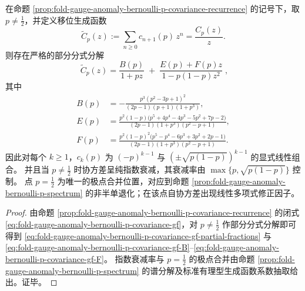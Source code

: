 \begin{corollary}[协方差生成函数的部分分式分解与指数衰减率]\label{cor:fold-gauge-anomaly-bernoulli-p-covariance-partial-fractions}
在命题 \ref{prop:fold-gauge-anomaly-bernoulli-p-covariance-recurrence} 的记号下，取 \(p\neq\tfrac12\)，并定义移位生成函数
\[
\widetilde C_p(z):=\sum_{n\ge 0}c_{n+1}(p)\,z^n=\frac{C_p(z)}{z}.
\]
则存在严格的部分分式分解
\begin{equation}\label{eq:fold-gauge-anomaly-bernoulli-p-covariance-gf-partial-fractions}
\boxed{\;
\widetilde C_p(z)
=\frac{B(p)}{1+p z}
\;+\;
\frac{E(p)+F(p)z}{1-p(1-p)z^2}\;},
\end{equation}
其中
\begin{align}
B(p)&=
-\frac{p^3(p^2-3p+1)^2}{(2p-1)(p+1)(1+p^3)},\label{eq:fold-gauge-anomaly-bernoulli-p-covariance-gf-B}\\
E(p)&=
\frac{p^2(1-p)\bigl(p^5+4p^4-4p^3-5p^2+7p-2\bigr)}{(2p-1)(1+p^3)(p^2-p+1)},\label{eq:fold-gauge-anomaly-bernoulli-p-covariance-gf-E}\\
F(p)&=
\frac{p^2(1-p)^2\bigl(p^5-p^4-6p^3+3p^2+2p-1\bigr)}{(2p-1)(1+p^3)(p^2-p+1)}.\label{eq:fold-gauge-anomaly-bernoulli-p-covariance-gf-F}
\end{align}
因此对每个 \(k\ge 1\)，\(c_k(p)\) 为 \(({-p})^{k-1}\) 与 \((\pm\sqrt{p(1-p)})^{k-1}\) 的显式线性组合。
并且当 \(p\neq\tfrac12\) 时协方差呈纯指数衰减，其衰减率由 \(\max\{p,\sqrt{p(1-p)}\}\) 控制。
点 \(p=\tfrac12\) 为唯一的极点合并位置，对应到命题 \ref{prop:fold-gauge-anomaly-bernoulli-p-spectrum} 的非半单退化；在该点自协方差出现线性多项式修正因子。
\end{corollary}
\begin{proof}
由命题 \ref{prop:fold-gauge-anomaly-bernoulli-p-covariance-recurrence} 的闭式 \eqref{eq:fold-gauge-anomaly-bernoulli-p-covariance-gf}，对 \(p\neq\tfrac12\) 作部分分式分解即可得到 \eqref{eq:fold-gauge-anomaly-bernoulli-p-covariance-gf-partial-fractions} 与 \eqref{eq:fold-gauge-anomaly-bernoulli-p-covariance-gf-B}--\eqref{eq:fold-gauge-anomaly-bernoulli-p-covariance-gf-F}。
指数衰减率与 \(p=\tfrac12\) 的极点合并由命题 \ref{prop:fold-gauge-anomaly-bernoulli-p-spectrum} 的谱分解及标准有理型生成函数系数抽取给出。证毕。
\end{proof}

